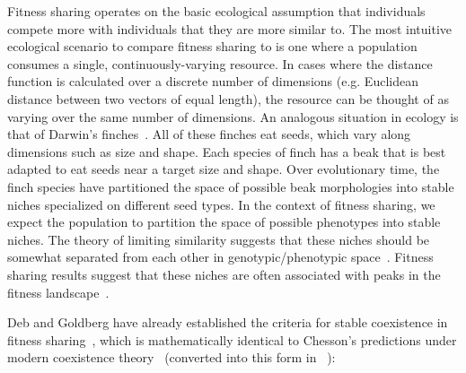Fitness sharing operates on the basic ecological assumption that individuals compete more with individuals that they are more similar to. The most intuitive ecological scenario to compare fitness sharing to is one where a population consumes a single, continuously-varying resource. In cases where the distance function is calculated over a discrete number of dimensions (e.g. Euclidean distance between two vectors of equal length), the resource can be thought of as varying over the same number of dimensions. An analogous situation in ecology is that of Darwin's finches~\cite{schluter_ecological_1985}. All of these finches eat seeds, which vary along dimensions such as size and shape. Each species of finch has a beak that is best adapted to eat seeds near a target size and shape.
Over evolutionary time, the finch species have partitioned the space of possible beak morphologies into stable niches specialized on different seed types. In the context of fitness sharing, we expect the population to partition the space of possible phenotypes into stable niches. The theory of limiting similarity suggests that these niches should be somewhat separated from each other in genotypic/phenotypic space~\cite{pacala_limiting_1994}. Fitness sharing results suggest that these niches are often associated with peaks in the fitness landscape~\cite{goldberg_genetic_1987}. 



Deb and Goldberg have already established the criteria for stable coexistence in fitness sharing~\cite{deb_investigation_1989}, which is mathematically identical to Chesson's predictions under modern coexistence theory~\cite{chesson_mechanisms_2000} (converted into this form in ~\cite{letten_linking_2017}):

